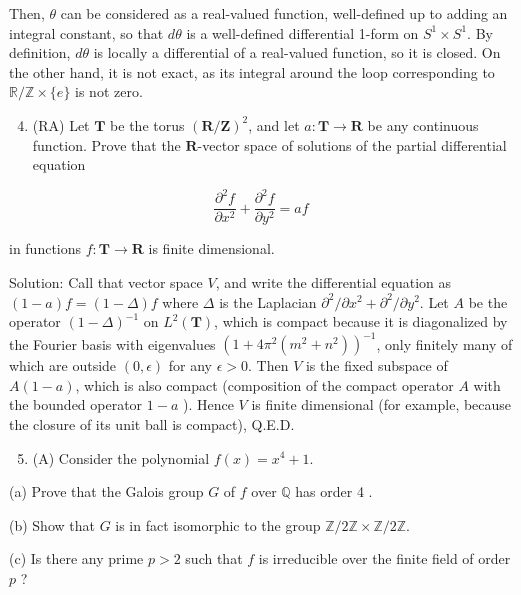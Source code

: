 \documentclass[10pt]{article}
\begin{document}
Then, $\theta$ can be considered as a real-valued function, well-defined up to adding an integral constant, so that $d \theta$ is a well-defined differential 1-form on $S^{1} \times S^{1}$. By definition, $d \theta$ is locally a differential of a real-valued function, so it is closed. On the other hand, it is not exact, as its integral around the loop corresponding to $\mathbb{R} / \mathbb{Z} \times\{e\}$ is not zero.

\begin{enumerate}
  \setcounter{enumi}{3}
  \item (RA) Let $\mathbf{T}$ be the torus $(\mathbf{R} / \mathbf{Z})^{2}$, and let $a: \mathbf{T} \rightarrow \mathbf{R}$ be any continuous function. Prove that the $\mathbf{R}$-vector space of solutions of the partial differential equation
\end{enumerate}

$$
\frac{\partial^{2} f}{\partial x^{2}}+\frac{\partial^{2} f}{\partial y^{2}}=a f
$$

in functions $f: \mathbf{T} \rightarrow \mathbf{R}$ is finite dimensional.

Solution: Call that vector space $V$, and write the differential equation as $(1-a) f=(1-\Delta) f$ where $\Delta$ is the Laplacian $\partial^{2} / \partial x^{2}+\partial^{2} / \partial y^{2}$. Let $A$ be the operator $(1-\Delta)^{-1}$ on $L^{2}(\mathbf{T})$, which is compact because it is diagonalized by the Fourier basis with eigenvalues $\left(1+4 \pi^{2}\left(m^{2}+n^{2}\right)\right)^{-1}$, only finitely many of which are outside $(0, \epsilon)$ for any $\epsilon>0$. Then $V$ is the fixed subspace of $A(1-a)$, which is also compact (composition of the compact operator $A$ with the bounded operator $1-a$ ). Hence $V$ is finite dimensional (for example, because the closure of its unit ball is compact), Q.E.D.

\begin{enumerate}
  \setcounter{enumi}{4}
  \item (A) Consider the polynomial $f(x)=x^{4}+1$.
\end{enumerate}

(a) Prove that the Galois group $G$ of $f$ over $\mathbb{Q}$ has order 4 .

(b) Show that $G$ is in fact isomorphic to the group $\mathbb{Z} / 2 \mathbb{Z} \times \mathbb{Z} / 2 \mathbb{Z}$.

(c) Is there any prime $p>2$ such that $f$ is irreducible over the finite field of order $p$ ?
\end{document}
